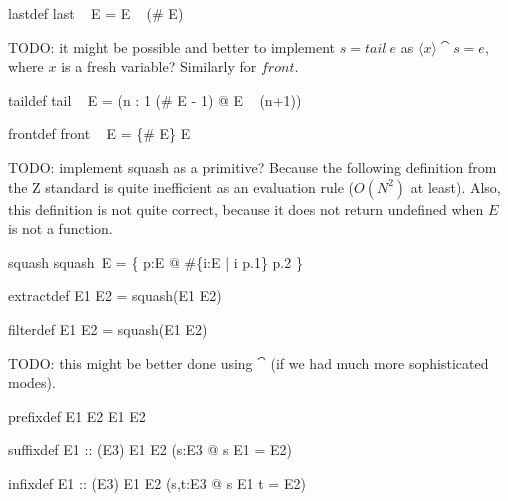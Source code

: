 \documentclass{article}
\begin{document}
\begin{zedrule}{lastdef}
   last ~ E = E ~ (\# E)
\end{zedrule}

TODO: it might be possible and better to implement $s=tail~e$
as $\langle x \rangle \cat s = e$, where $x$ is a fresh variable?
Similarly for $front$.
\begin{zedrule}{taildef}
   tail ~ E = (\lambda n : 1 \upto (\# E - 1) @ E ~ (n+1))
\end{zedrule}

\begin{zedrule}{frontdef}
   front ~ E = \{\# E\} \ndres E
\end{zedrule}

TODO: implement squash as a primitive?
Because the following definition from the Z standard is quite 
inefficient as an evaluation rule ($O(N^2)$ at least).  
Also, this definition is not quite correct, because it does
not return undefined when $E$ is not a function.
\begin{zedrule}{squash}
   squash~E = \{ p:E @ \#\{i:\dom E | i \leq p.1\} \mapsto p.2 \}
\end{zedrule}

\begin{zedrule}{extractdef}
   E1 \extract E2 = squash(E1 \dres E2)
\end{zedrule}

\begin{zedrule}{filterdef}
   E1 \filter E2 = squash(E1 \rres E2)
\end{zedrule}

TODO: this might be better done using $\cat$
(if we had much more sophisticated modes).
\begin{zedrule}{prefixdef}
   E1 \prefix E2 \iff E1 \subseteq E2 
\end{zedrule}

\begin{zedrule}{suffixdef}
   E1 :: \power (\arithmos \cross E3)
\derives
   E1 \suffix E2 \iff (\exists s:\seq E3 @ s \cat E1 = E2)
\end{zedrule}

\begin{zedrule}{infixdef}
   E1 :: \power (\arithmos \cross E3)
\derives
   E1 \infix E2 \iff (\exists s,t:\seq E3 @ s \cat E1 \cat t = E2)
\end{zedrule}
\end{document}
